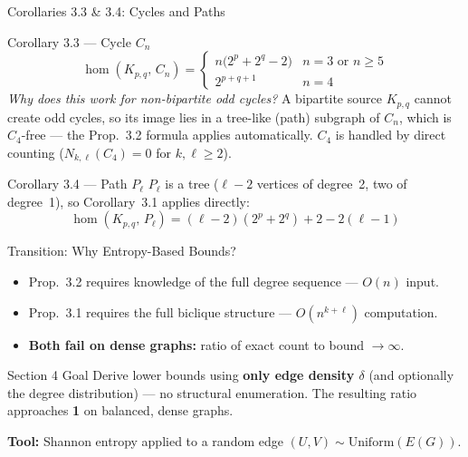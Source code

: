 \documentclass[aspectratio=169]{beamer}
\begin{document}
\begin{frame}{Corollaries 3.3 \& 3.4: Cycles and Paths}
  \begin{block}{Corollary 3.3 --- Cycle $C_n$}
    \[
      \hom(K_{p,q},\,C_n) = \begin{cases}
        n\bigl(2^p + 2^q - 2\bigr) & n = 3 \text{ or } n \geq 5 \\
        2^{p+q+1} & n = 4
      \end{cases}
    \]
    \textit{Why does this work for non-bipartite odd cycles?}
    A bipartite source $K_{p,q}$ cannot create odd cycles, so its image lies in a tree-like (path) subgraph of $C_n$, which is $C_4$-free --- the Prop.\ 3.2 formula applies automatically.
    $C_4$ is handled by direct counting ($N_{k,\ell}(C_4) = 0$ for $k,\ell \geq 2$).
  \end{block}

  \begin{block}{Corollary 3.4 --- Path $P_\ell$}
    $P_\ell$ is a tree ($\ell - 2$ vertices of degree~2, two of degree~1), so Corollary~3.1 applies directly:
    \[
      \hom(K_{p,q},\,P_\ell) = (\ell-2)(2^p+2^q) + 2 - 2(\ell-1)
    \]
  \end{block}
\end{frame}

\begin{frame}{Transition: Why Entropy-Based Bounds?}
  \begin{itemize}
    \item Prop.\ 3.2 requires knowledge of the full degree sequence --- $O(n)$ input.
    \item Prop.\ 3.1 requires the full biclique structure --- $O(n^{k+\ell})$ computation.
    \item \textbf{Both fail on dense graphs:} ratio of exact count to bound $\to \infty$.
  \end{itemize}

  \vspace{0.5em}
  \begin{alertblock}{Section 4 Goal}
    Derive lower bounds using \textbf{only edge density $\delta$} (and optionally the degree distribution) --- no structural enumeration. The resulting ratio approaches \textbf{1} on balanced, dense graphs.
  \end{alertblock}

  \vspace{0.3em}
  \textbf{Tool:} Shannon entropy applied to a random edge $(U, V) \sim \mathrm{Uniform}(E(G))$.
\end{frame}
\end{document}
